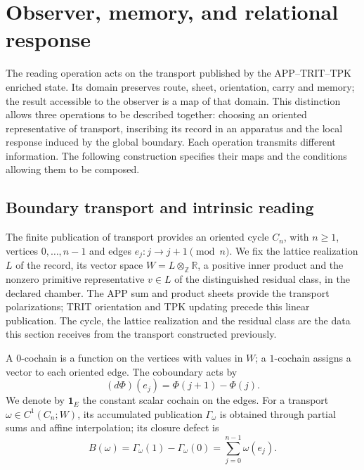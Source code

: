 
\section{Observer, memory, and relational response}
\label{vii:vii:sec:observador-respuesta}

The reading operation acts on the transport published by the
APP--TRIT--TPK enriched state. Its domain preserves route, sheet, orientation,
carry and memory; the result accessible to the observer is a map
of that domain. This distinction allows three operations to be described
together: choosing an oriented representative of transport,
inscribing its record in an apparatus and the local response induced
by the global boundary. Each operation transmits different information.
The following construction specifies their maps and the conditions
allowing them to be composed.

\subsection{Boundary transport and intrinsic reading}
\label{vii:vii:sec:observador-ciclo}

The finite publication of transport provides an oriented cycle
\(C_n\), with \(n\geq1\), vertices \(0,\ldots,n-1\) and edges
\(e_j:j\longrightarrow j+1\pmod n\). We fix the lattice realization
\(L\) of the record, its vector space
\(W=L\otimes_{\mathbb Z}\mathbb R\), a positive inner product and
the nonzero primitive representative \(v\in L\) of the distinguished residual
class, in the declared chamber. The APP sum and product sheets
provide the transport polarizations; TRIT orientation and
TPK updating precede this linear publication. The cycle,
the lattice realization and the residual class are the data this
section receives from the transport constructed previously.

A \(0\)-cochain is a function on the vertices with values in
\(W\); a \(1\)-cochain assigns a vector to each oriented edge.
The coboundary acts by
\[
 (d\Phi)(e_j)=\Phi(j+1)-\Phi(j).
\]
We denote by \(\mathbf1_E\) the constant scalar cochain on the
edges. For a transport \(\omega\in C^1(C_n;W)\), its accumulated
publication \(\Gamma_\omega\) is obtained through partial sums and
affine interpolation; its closure defect is
\begin{equation}
 B(\omega)=\Gamma_\omega(1)-\Gamma_\omega(0)
 =\sum_{j=0}^{n-1}\omega(e_j).
 \label{vii:vii:eq:observador-defecto}
\end{equation}

